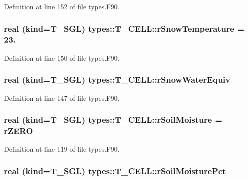 Definition at line 152 of file types.F90.

\hypertarget{typetypes_1_1_t___c_e_l_l_a1f942e1761770a081d65e6b569792855}{
\subsubsection[{rSnowTemperature}]{\setlength{\rightskip}{0pt plus 5cm}real (kind={\bf T\_\-SGL}) {\bf types::T\_\-CELL::rSnowTemperature} = 23.}}
\label{typetypes_1_1_t___c_e_l_l_a1f942e1761770a081d65e6b569792855}


Definition at line 150 of file types.F90.

\hypertarget{typetypes_1_1_t___c_e_l_l_a4f3f2be4779ed929d5c545714eda0fd5}{
\subsubsection[{rSnowWaterEquiv}]{\setlength{\rightskip}{0pt plus 5cm}real (kind={\bf T\_\-SGL}) {\bf types::T\_\-CELL::rSnowWaterEquiv}}}
\label{typetypes_1_1_t___c_e_l_l_a4f3f2be4779ed929d5c545714eda0fd5}


Definition at line 147 of file types.F90.

\hypertarget{typetypes_1_1_t___c_e_l_l_a9db4438b4a4c76c906bef2c44e1187bc}{
\subsubsection[{rSoilMoisture}]{\setlength{\rightskip}{0pt plus 5cm}real (kind={\bf T\_\-SGL}) {\bf types::T\_\-CELL::rSoilMoisture} = {\bf rZERO}}}
\label{typetypes_1_1_t___c_e_l_l_a9db4438b4a4c76c906bef2c44e1187bc}


Definition at line 119 of file types.F90.

\hypertarget{typetypes_1_1_t___c_e_l_l_a413568e4642683dec97432a48aa7648d}{
\subsubsection[{rSoilMoisturePct}]{\setlength{\rightskip}{0pt plus 5cm}real (kind={\bf T\_\-SGL}) {\bf types::T\_\-CELL::rSoilMoisturePct}}}
\label{typetypes_1_1_t___c_e_l_l_a413568e4642683dec97432a48aa7648d}


